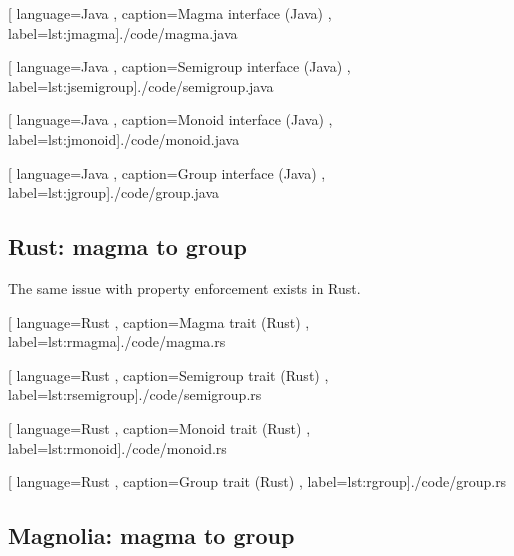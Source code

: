\begin{center}
  
    [ language=Java
    , caption={Magma interface (Java)}
    , label=lst:jmagma]{./code/magma.java}
\end{center}

\begin{center}
  
    [ language=Java
    , caption={Semigroup interface (Java)}
    , label=lst:jsemigroup]{./code/semigroup.java}
\end{center}

\begin{center}
  
    [ language=Java
    , caption={Monoid interface (Java)}
    , label=lst:jmonoid]{./code/monoid.java}
\end{center}

\begin{center}
  
    [ language=Java
    , caption={Group interface (Java)}
    , label=lst:jgroup]{./code/group.java}
\end{center}

\subsection{Rust: magma to group}

The same issue with property enforcement exists in Rust.

\begin{center}
  
    [ language=Rust
    , caption={Magma trait (Rust)}
    , label=lst:rmagma]{./code/magma.rs}
\end{center}

\begin{center}
  
    [ language=Rust
    , caption={Semigroup trait (Rust)}
    , label=lst:rsemigroup]{./code/semigroup.rs}
\end{center}

\begin{center}
  
    [ language=Rust
    , caption={Monoid trait (Rust)}
    , label=lst:rmonoid]{./code/monoid.rs}
\end{center}

\begin{center}
  
    [ language=Rust
    , caption={Group trait (Rust)}
    , label=lst:rgroup]{./code/group.rs}
\end{center}

\subsection{Magnolia: magma to group}

